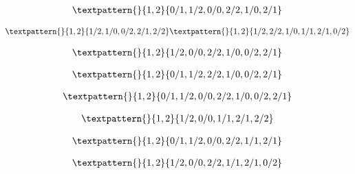 \begin{equation}
	\begin{gathered}
		\textpattern{}{1,2}{0/1,1/2,0/0,2/2,1/0,2/1}
	\end{gathered}
	\label{cls:174}
\end{equation}

\begin{equation}
	\begin{gathered}
		\textpattern{}{1,2}{1/2,1/0,0/2,2/1,2/2}
		\textpattern{}{1,2}{1/2,2/2,1/0,1/1,2/1,0/2}
	\end{gathered}
	\label{cls:175}
\end{equation}

\begin{equation}
	\begin{gathered}
		\textpattern{}{1,2}{1/2,0/0,2/2,1/0,0/2,2/1}
	\end{gathered}
	\label{cls:176}
\end{equation}

\begin{equation}
	\begin{gathered}
		\textpattern{}{1,2}{0/1,1/2,2/2,1/0,0/2,2/1}
	\end{gathered}
	\label{cls:177}
\end{equation}

\begin{equation}
	\begin{gathered}
		\textpattern{}{1,2}{0/1,1/2,0/0,2/2,1/0,0/2,2/1}
	\end{gathered}
	\label{cls:178}
\end{equation}

\begin{equation}
	\begin{gathered}
		\textpattern{}{1,2}{1/2,0/0,1/1,2/1,2/2}
	\end{gathered}
	\label{cls:179}
\end{equation}

\begin{equation}
	\begin{gathered}
		\textpattern{}{1,2}{0/1,1/2,0/0,2/2,1/1,2/1}
	\end{gathered}
	\label{cls:180}
\end{equation}

\begin{equation}
	\begin{gathered}
		\textpattern{}{1,2}{1/2,0/0,2/2,1/1,2/1,0/2}
	\end{gathered}
	\label{cls:181}
\end{equation}

